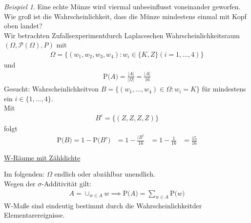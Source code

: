 \documentclass[a4paper,12pt,fleqn]{scrartcl}
\newcommand{\m}[1]{\mathcal{ #1 }}
\newcommand{\p}[1]{\text{P(} #1 \text{)}}
\newcommand{\ZE}{Zufallsexperiment}
\newcommand{\WR}{Wahrscheinlichkeitsraum}
\newcommand{\Wk}{Wahrscheinlichkeit}
\theoremstyle{definition}
\theoremstyle{plain}
\theoremstyle{remark}
\newtheorem{beispiel}[definition]{Beispiel}
\begin{document}
\begin{beispiel}
Eine echte Münze wird viermal unbeeinflusst voneinander geworfen. Wie groß ist die Wahrscheinlichkeit, dass die Münze mindestens einmal mit Kopf oben landet? \\
Wir betrachten \ZE durch Laplaceschen \WR \, $( \Omega , \m{P}(\Omega)  , P)$ mit 
\begin{align*}
\Omega = \{ (w_1, w_2, w_3, w_4) : w_i \in \{ K , Z \} (i = 1,...,4) \} 
\end{align*} 
und 
\begin{align*}
 \p{A} = \frac{|A|}{|\Omega|} = \frac{|A|}{16}
\end{align*}
Gesucht: \Wk von  $B = \{ (w_1,...,w_4) \in \Omega : w_i = K \} $ für mindestens ein $ i \in \{1,...,4 \} $. \\
Mit 
\begin{align*}
B^c = \{ (Z,Z,Z,Z) \} 
\end{align*}
folgt
\begin{align*}
\p{B} = 1- \p{B^c}
&= 1- \frac{|B^c}{16}
&= 1- \frac{1}{16}
&= \frac{15}{16}
\end{align*}
\end{beispiel}

\underline{W-Räume mit Zähldichte}

Im folgenden: $\Omega$ endlich oder abzählbar unendlich. \\
Wegen der $\sigma$-Additivität gilt:
\begin{align*}
A = \cup_{w \in A} {w} \implies \p{A} = \sum_{w \in A}{\p{w}}
\end{align*}
W-Maße sind eindeutig bestimmt durch die \Wk der Elementarereignisse.
\end{document}
